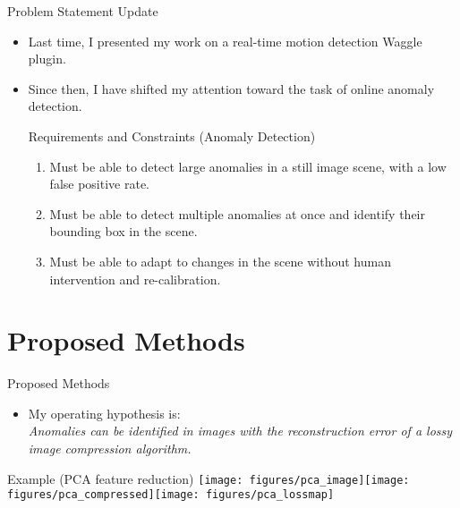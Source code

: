 \documentclass[10pt]{beamer}
\begin{document}
\begin{frame}{Problem Statement Update}

\begin{itemize}
\item Last time, I presented my work on a real-time motion detection Waggle plugin.

\item Since then, I have shifted my attention toward the task of online anomaly detection.\\[4mm]

\begin{alertblock}{Requirements and Constraints (Anomaly Detection)}
\begin{enumerate}
\item Must be able to detect large anomalies in a still image scene, with a low false positive rate.

\item Must be able to detect multiple anomalies at once and identify their bounding box in the scene.

\item Must be able to adapt to changes in the scene without human intervention and re-calibration.
\end{enumerate}
\end{alertblock}

\end{itemize}
\end{frame}

\section{Proposed Methods}

\begin{frame}{Proposed Methods}
\begin{itemize}

\item My operating hypothesis is:\\ \alert{\textit{Anomalies can be identified in images with the reconstruction error of a lossy image compression algorithm.}}\\[2cm]
\end{itemize}


\begin{exampleblock}{Example (PCA feature reduction)}
\texttt{[image: figures/pca\_image]}\texttt{[image: figures/pca\_compressed]}\texttt{[image: figures/pca\_lossmap]}
\end{exampleblock}

\end{frame}
\end{document}
